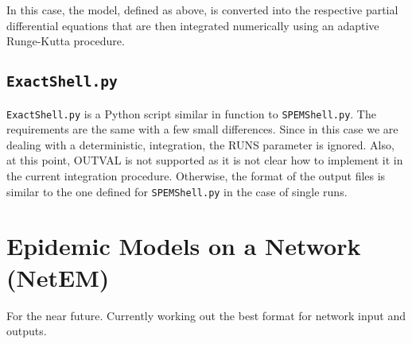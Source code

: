 \documentclass[a4paper, 11pt, fleqn]{paper}
\begin{document}
In this case, the model, defined as above, is converted into the respective partial differential equations that are then integrated numerically using an adaptive Runge-Kutta procedure. 

\subsection{\texttt{ExactShell.py}}

\texttt{ExactShell.py} is a Python script similar in function to \texttt{SPEMShell.py}. The requirements are the same with a few small differences. Since in this case we are dealing with a deterministic, integration, the RUNS parameter is ignored. Also, at this point, OUTVAL is not supported as it is not clear how to implement it in the current integration procedure. Otherwise, the format of the output files is similar to the one defined for \texttt{SPEMShell.py} in the case of single runs.

\section{Epidemic Models on a Network (NetEM)}

For the near future. Currently working out the best format for network input and outputs.
\end{document}
